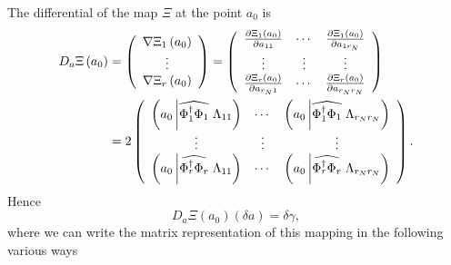 \documentclass[aps,preprint]{revtex4}%
\begin{document}
The differential of the map $\Xi$ at the point $a_{0}$ is
\begin{align}
D_{a}\Xi\left(  a_{0}\right)   &  =\left(
\begin{array}
[c]{c}%
\nabla\Xi_{1}\left(  a_{0}\right) \\
\vdots\\
\nabla\Xi_{r}\left(  a_{0}\right)
\end{array}
\right)  =\left(
\begin{array}
[c]{ccc}%
\frac{\partial\Xi_{1}\left(  a_{0}\right)  }{\partial a_{11}} & \cdots &
\frac{\partial\Xi_{1}\left(  a_{0}\right)  }{\partial a_{1r_{N}}}\\
\vdots & \vdots & \vdots\\
\frac{\partial\Xi_{r}\left(  a_{0}\right)  }{\partial a_{r_{N}1}} & \cdots &
\frac{\partial\Xi_{r}\left(  a_{0}\right)  }{\partial a_{r_{N}r_{N}}}%
\end{array}
\right) \nonumber\\
&  =2\left(
\begin{array}
[c]{ccc}%
\left(  a_{0}\left\vert \widehat{\Phi_{1}^{\dagger}\Phi_{1}}\right.
\Lambda_{11}\right)  & \cdots & \left(  a_{0}\left\vert \widehat{\Phi
_{1}^{\dagger}\Phi_{1}}\right.  \Lambda_{r_{N}r_{N}}\right) \\
\vdots & \vdots & \vdots\\
\left(  a_{0}\left\vert \widehat{\Phi_{r}^{\dagger}\Phi_{r}}\right.
\Lambda_{11}\right)  & \cdots & \left(  a_{0}\left\vert \widehat{\Phi
_{r}^{\dagger}\Phi_{r}}\right.  \Lambda_{r_{N}r_{N}}\right)
\end{array}
\right)  .
\end{align}
Hence
\begin{equation}
D_{a}\Xi\left(  a_{0}\right)  \left(  \delta a\right)  =\delta\gamma,
\end{equation}
where we can write the matrix representation of this mapping in the following
various ways
\end{document}
